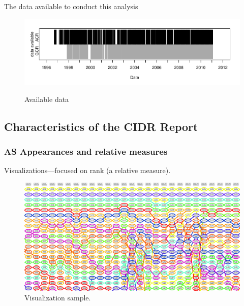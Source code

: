 \chapter{}
\label{chap:analysis}

The data available to conduct this analysis

\begin{figure}[H]
\begin{centering}
    \includegraphics[width=6in]{figures/data_avail.pdf}
    \vspace{-2em}\\
    \caption{Available data}
\end{centering}
\end{figure}

\section{Characteristics of the CIDR Report}

\subsection{AS Appearances and relative measures}

Visualizations---focused on rank (a relative measure).

\begin{figure}[H]
\begin{centering}
    \includegraphics[width=6in]{figures/viz_sample.jpg}
    \caption{Visualization sample.}
\end{centering}
\end{figure}

